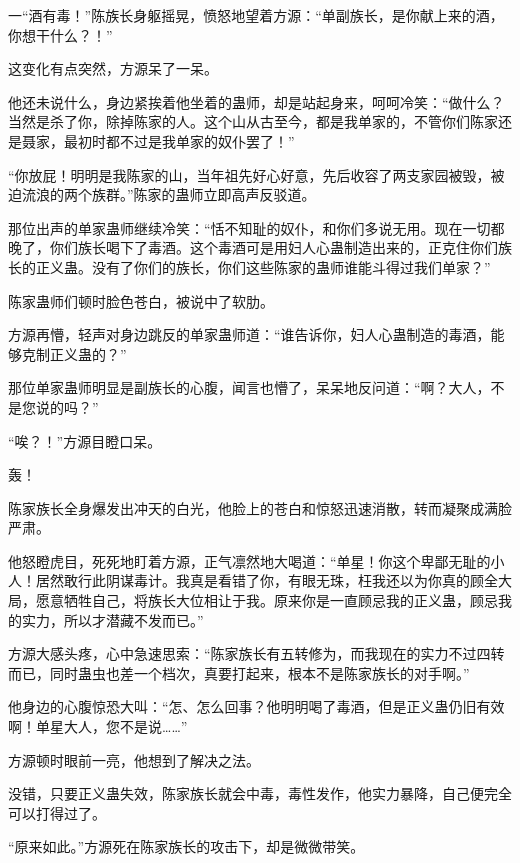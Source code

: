 
\begin{this_body}



一“酒有毒！”陈族长身躯摇晃，愤怒地望着方源：“单副族长，是你献上来的酒，你想干什么？！”

这变化有点突然，方源呆了一呆。

他还未说什么，身边紧挨着他坐着的蛊师，却是站起身来，呵呵冷笑：“做什么？当然是杀了你，除掉陈家的人。这个山从古至今，都是我单家的，不管你们陈家还是聂家，最初时都不过是我单家的奴仆罢了！”

“你放屁！明明是我陈家的山，当年祖先好心好意，先后收容了两支家园被毁，被迫流浪的两个族群。”陈家的蛊师立即高声反驳道。

那位出声的单家蛊师继续冷笑：“恬不知耻的奴仆，和你们多说无用。现在一切都晚了，你们族长喝下了毒酒。这个毒酒可是用妇人心蛊制造出来的，正克住你们族长的正义蛊。没有了你们的族长，你们这些陈家的蛊师谁能斗得过我们单家？”

陈家蛊师们顿时脸色苍白，被说中了软肋。

方源再懵，轻声对身边跳反的单家蛊师道：“谁告诉你，妇人心蛊制造的毒酒，能够克制正义蛊的？”

那位单家蛊师明显是副族长的心腹，闻言也懵了，呆呆地反问道：“啊？大人，不是您说的吗？”

“唉？！”方源目瞪口呆。

轰！

陈家族长全身爆发出冲天的白光，他脸上的苍白和惊怒迅速消散，转而凝聚成满脸严肃。

他怒瞪虎目，死死地盯着方源，正气凛然地大喝道：“单星！你这个卑鄙无耻的小人！居然敢行此阴谋毒计。我真是看错了你，有眼无珠，枉我还以为你真的顾全大局，愿意牺牲自己，将族长大位相让于我。原来你是一直顾忌我的正义蛊，顾忌我的实力，所以才潜藏不发而已。”

方源大感头疼，心中急速思索：“陈家族长有五转修为，而我现在的实力不过四转而已，同时蛊虫也差一个档次，真要打起来，根本不是陈家族长的对手啊。”

他身边的心腹惊恐大叫：“怎、怎么回事？他明明喝了毒酒，但是正义蛊仍旧有效啊！单星大人，您不是说……”

方源顿时眼前一亮，他想到了解决之法。

没错，只要正义蛊失效，陈家族长就会中毒，毒性发作，他实力暴降，自己便完全可以打得过了。

“原来如此。”方源死在陈家族长的攻击下，却是微微带笑。


\end{this_body}
